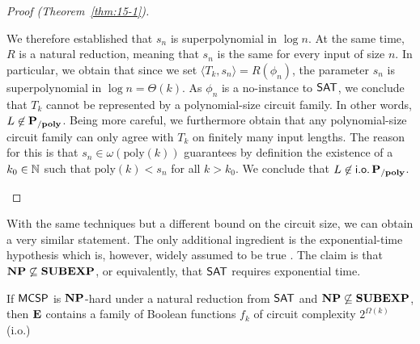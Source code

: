 \documentclass[11pt]{article}
\begin{document}
\begin{proof}[Proof (Theorem~\ref{thm:15-1})]
\begin{itemize}
\begin{enumerate}[(i)]
          We therefore established that $s_n$ is superpolynomial in $\log n$.
          At the same time, $R$ is a natural reduction, meaning that $s_n$ is
          the same for every input of size $n$.
          In particular, we obtain that since we set
          $\langle T_k, s_n \rangle = R(\phi_n)$, the parameter
          $s_n$ is superpolynomial in $\log n = \Theta(k)$.
          As $\phi_n$ is a no-instance to $\mathsf{SAT}$, we conclude that
          $T_k$ cannot be represented by a polynomial-size circuit family.
          In other words, $L \not\in \mathbf{P_{/poly}}$.
          Being more careful, we furthermore obtain that any polynomial-size
          circuit family can only agree with $T_k$ on finitely many
          input lengths. The reason for this is that
          $s_n \in \omega(\mathrm{poly}(k))$ guarantees
          by definition the existence of a $k_0 \in {\mathbb{N}}$ such that
          $\mathrm{poly}(k) < s_n$ for all $k > k_0$.
          We conclude that $L \not\in \mathsf{i.o.}\, \mathbf{P_{/poly}}$.
      \end{enumerate}
	\end{itemize}
\end{proof}

With the same techniques but a different bound on the circuit size, we can
obtain a very similar statement. The only additional ingredient is
the exponential-time hypothesis which is, however, widely assumed to
be true \cite{impagliazzo99}.
The claim is that $\mathbf{NP} \not\subseteq \mathbf{SUBEXP}$, or equivalently, that
$\mathsf{SAT}$ requires exponential time.

\begin{theorem}[\cite{10.1145/335305.335314}]
  \label{thm:15-2}
  If $\mathsf{MCSP}$ is $\mathbf{NP}$-hard under a natural reduction from
  $\mathsf{SAT}$ and $\mathbf{NP} \not\subseteq \mathbf{SUBEXP}$, then
  $\mathbf{E}$ contains a family of Boolean functions
  $f_k$ of circuit complexity $2^{\Omega(k)}$ (i.o.)
\end{theorem}
\end{document}

